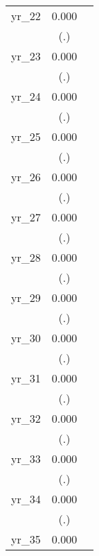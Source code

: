 \begin{table}[htbp]
\begin{tabular}{l*{2}{c}}
yr\_22       &       0.000         &                     \\
            &         (.)         &                     \\
yr\_23       &       0.000         &                     \\
            &         (.)         &                     \\
yr\_24       &       0.000         &                     \\
            &         (.)         &                     \\
yr\_25       &       0.000         &                     \\
            &         (.)         &                     \\
yr\_26       &       0.000         &                     \\
            &         (.)         &                     \\
yr\_27       &       0.000         &                     \\
            &         (.)         &                     \\
yr\_28       &       0.000         &                     \\
            &         (.)         &                     \\
yr\_29       &       0.000         &                     \\
            &         (.)         &                     \\
yr\_30       &       0.000         &                     \\
            &         (.)         &                     \\
yr\_31       &       0.000         &                     \\
            &         (.)         &                     \\
yr\_32       &       0.000         &                     \\
            &         (.)         &                     \\
yr\_33       &       0.000         &                     \\
            &         (.)         &                     \\
yr\_34       &       0.000         &                     \\
            &         (.)         &                     \\
yr\_35       &       0.000         &                     \\

\end{tabular}
\end{table}
